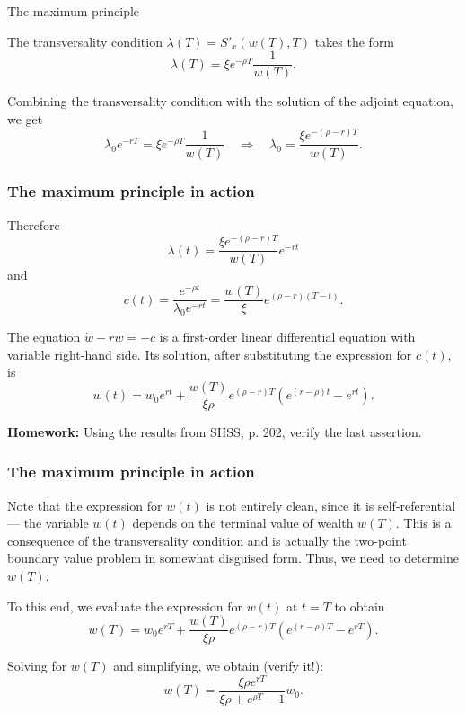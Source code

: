 \documentclass[10pt]{beamer}
\theoremstyle{definition}
\begin{document}
\begin{section}{The maximum principle}
\begin{frame}[fragile]
\begin{example}[cont.]
The transversality condition $ \lambda(T)=S'_x(w(T),T) $ takes the form \[ \lambda(T) = \xi e^{-\rho T}\dfrac{1}{w(T)}. \]

Combining the transversality condition with the solution of the adjoint equation, we get \[ \lambda_0 e^{-rT} = \xi e^{-\rho T}\dfrac{1}{w(T)} \quad \Rightarrow \quad \lambda_0 = \dfrac{\xi e^{-(\rho-r)T}}{w(T)}. \]
\end{example}
\end{frame}

\begin{frame}[fragile]
\frametitle{The maximum principle in action}
\addtocounter{theorem}{-1}
\begin{example}[cont.]
Therefore \[ \lambda(t)=\dfrac{\xi e^{-(\rho-r)T}}{w(T)} e^{-rt} \] and \[ c(t) = \dfrac{e^{-\rho t}}{\lambda_0 e^{-rt}} = \dfrac{w(T)}{\xi}e^{(\rho-r)(T-t)}.  \]\bigskip

The equation $ \dot{w} - rw = -c $ is a first-order linear differential equation with variable right-hand side. Its solution, after substituting the expression for $ c(t) $, is 
\[ w(t) = w_0 e^{rt} + \dfrac{w(T)}{\xi \rho}e^{(\rho-r)T}\left( e^{(r-\rho)t}-e^{rt} \right). \]

\textbf{Homework:} Using the results from SHSS, p. 202, verify the last assertion.
\end{example}
\end{frame}

\begin{frame}[fragile]
\frametitle{The maximum principle in action}
\addtocounter{theorem}{-1}
\begin{example}[cont.]
Note that the expression for $ w(t) $ is not entirely clean, since it is self-referential --- the variable $ w(t) $ depends on the terminal value of wealth $ w(T) $. This is a consequence of the transversality condition and is actually the two-point boundary value problem in somewhat disguised form. Thus, we need to determine $ w(T) $. \bigskip

To this end, we evaluate the expression for $ w(t) $ at $ t=T $ to obtain
\[ w(T) = w_0 e^{rT} + \dfrac{w(T)}{\xi \rho}e^{(\rho-r)T}\left( e^{(r-\rho)T}-e^{rT} \right). \]

Solving for $ w(T) $ and simplifying, we obtain (verify it!):
\[ w(T) = \dfrac{\xi \rho e^{rT}}{\xi \rho + e^{\rho T}-1}w_0. \]
\end{example}
\end{frame}


\end{section}
\end{document}
